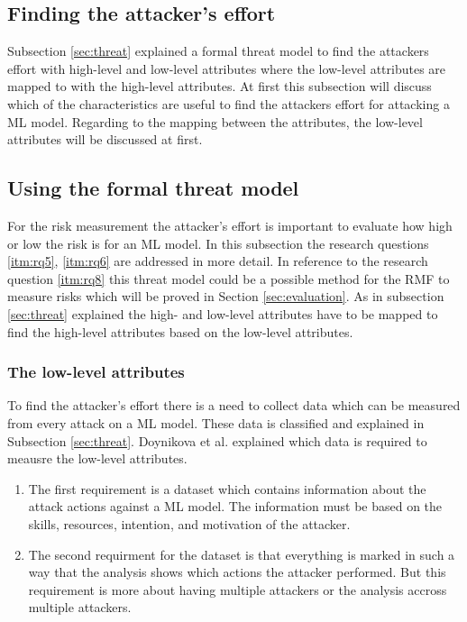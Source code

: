 \subsection{Finding the attacker's effort}

Subsection \ref{sec:threat} explained a formal threat model to find the attackers effort with high-level and low-level attributes where the low-level attributes are mapped to with the high-level attributes. At first this subsection will discuss which of the characteristics are useful to find the attackers effort for attacking a ML model. Regarding to the mapping between the attributes, the low-level attributes will be discussed at first.

\subsection{Using the formal threat model}

For the risk measurement the attacker's effort is important to evaluate how high or low the risk is for an ML model. In this subsection the research questions \ref{itm:rq5}, \ref{itm:rq6} are addressed in more detail. In reference to the research question \ref{itm:rq8} this threat model could be a possible method for the RMF to measure risks which will be proved in Section \ref{sec:evaluation}.
As in subsection \ref{sec:threat} explained the high- and low-level attributes have to be mapped to find the high-level attributes based on the low-level attributes.

\subsubsection*{The low-level attributes}

To find the attacker's effort there is a need to collect data which can be measured from every attack on a ML model. These data is classified and explained in Subsection \ref{sec:threat}. Doynikova et al. explained which data is required to meausre the low-level attributes.

\begin{enumerate}
  \item The first requirement is a dataset which contains information about the attack actions against a ML model. The information must be based on the skills, resources, intention, and motivation of the attacker.
  \item The second requirment for the dataset is that everything is marked in such a way that the analysis shows which actions the attacker performed. But this requirement is more about having multiple attackers or the analysis accross multiple attackers.
\end{enumerate}

